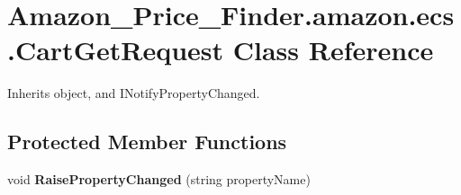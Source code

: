 \hypertarget{class_amazon___price___finder_1_1amazon_1_1ecs_1_1_cart_get_request}{\section{Amazon\-\_\-\-Price\-\_\-\-Finder.\-amazon.\-ecs.\-Cart\-Get\-Request Class Reference}
\label{class_amazon___price___finder_1_1amazon_1_1ecs_1_1_cart_get_request}
}


 




Inherits object, and I\-Notify\-Property\-Changed.

\subsection*{Protected Member Functions}
\begin{DoxyCompactItemize}
\item 
\hypertarget{class_amazon___price___finder_1_1amazon_1_1ecs_1_1_cart_get_request_a141047a9977439fc3df4d18de8d190ee}{void {\bfseries Raise\-Property\-Changed} (string property\-Name)}\label{class_amazon___price___finder_1_1amazon_1_1ecs_1_1_cart_get_request_a141047a9977439fc3df4d18de8d190ee}

\end{DoxyCompactItemize}
